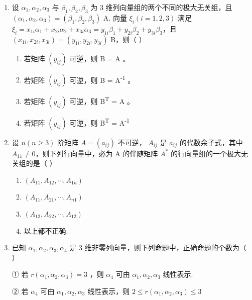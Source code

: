 \documentclass[12pt, a4paper]{ctexart}
\begin{document}
\begin{enumerate}
    \item 设 $ \alpha_{1}, \alpha_{2}, \alpha_{3} $ 与 $ \beta_{1}, \beta_{2}, \beta_{3} $ 为 3 维列向量组的两个不同的极大无关组，且 $ (\alpha_{1}, \alpha_{2}, \alpha_{3}) = (\beta_{1}, \beta_{2}, \beta_{3}) $ A. 向量 $ \xi_{i} (i = 1, 2, 3) $ 满足 $ \xi_{i} = x_{1i} \alpha_{1} + x_{2i} \alpha_{2} + x_{3i} \alpha_{3} = y_{1i} \beta_{1} + y_{2i} \beta_{2} + y_{3i} \beta_{3} $，且 $ (x_{1i}, x_{2i}, x_{3i}) = (y_{1i}, y_{2i}, y_{3i}) $ B，则（ \underline{\hspace{1cm}} ）
    \begin{enumerate}[label=(\Alph*)]
        \item 若矩阵 $ \left(y_{ij}\right) $ 可逆，则 B = A 。
        \item 若矩阵 $ \left(y_{ij}\right) $ 可逆，则 B = A\textsuperscript{-1} 。
        \item 若矩阵 $ \left(y_{ij}\right) $ 可逆，则 B\textsuperscript{T} = A 。
        \item 若矩阵 $ \left(y_{ij}\right) $ 可逆，则 B\textsuperscript{T} = A\textsuperscript{-1}
    \end{enumerate}

    \item 设 $ n (n \geq 3) $ 阶矩阵 $ A = (a_{ij}) $ 不可逆， $ A_{ij} $ 是 $ a_{ij} $ 的代数余子式，其中 $ A_{11} \neq 0 $，则下列行向量中，必为 A 的伴随矩阵 $ A^{*} $ 的行向量组的一个极大无关组的是（ \underline{\hspace{1cm}} ）
    \begin{enumerate}[label=(\Alph*)]
        \item $ \left(A_{11}, A_{12}, \cdots, A_{1n}\right) $
        \item $ \left(A_{11}, A_{21}, \cdots, A_{n1}\right) $
        \item $ \left(A_{12}, A_{22}, \cdots, A_{12}\right) $
        \item 以上都不正确.
    \end{enumerate}

    \item 已知 $ \alpha_{1}, \alpha_{2}, \alpha_{3}, \alpha_{4} $ 是 3 维非零列向量，则下列命题中，正确命题的个数为（ \underline{\hspace{1cm}} ）
    
    ① 若 $ r(\alpha_{1},\alpha_{2},\alpha_{3})=3 $ ，则 $ \alpha_{4} $ 可由 $ \alpha_{1},\alpha_{2},\alpha_{3} $ 线性表示.
    
    ② 若 $ \alpha_{4} $ 可由 $ \alpha_{1},\alpha_{2},\alpha_{3} $ 线性表示，则 $ 2 \leq r(\alpha_{1},\alpha_{2},\alpha_{3}) \leq 3 $
    

\end{enumerate}
\end{document}
